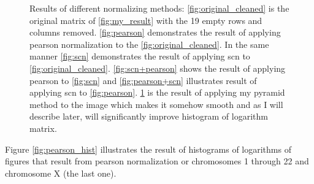 \documentclass{article}
\begin{document}
\begin{figure}[H]
\begin{subfigure}[b]{.3\textwidth}
        \caption{}
        \label{fig:pyr}
    \end{subfigure}
\caption{Results of different normalizing methods: 
    \ref{fig:original_cleaned} is the original matrix of \ref{fig:my_result}
    with the 19 empty rows and columns removed.
    \ref{fig:pearson} demonstrates the result of applying pearson normalization
    to the \ref{fig:original_cleaned}.
    In the same manner \ref{fig:scn} demonstrates the 
    result of applying scn to \ref{fig:original_cleaned}.
    \ref{fig:scn+pearson} shows the result of applying pearson to 
    \ref{fig:scn} and \ref{fig:pearson+scn} illustrates
    result of applying scn to \ref{fig:pearson}.
    \ref{fig:pyr} is the result of applying my pyramid method to the image
    which makes it somehow smooth and as I will describe later, will
    significantly improve histogram of logarithm matrix.
    }
    \label{fig:normalizations}
\end{figure}

Figure \ref{fig:pearson_hist} illustrates the result of histograms of
logarithms of figures that result from pearson normalization or chromosomes
1 through 22 and chromosome X (the last one).
\end{document}
